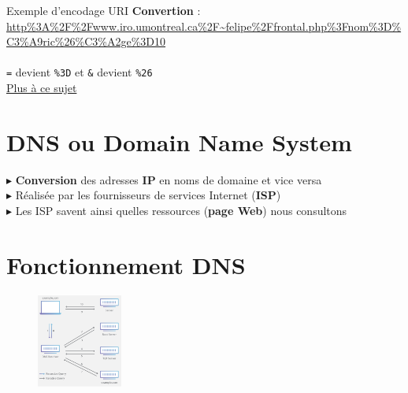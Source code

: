 \documentclass{report}
\begin{document}
\begin{multicols*}{3}
\begin{EExample}{Exemple d'encodage URI}{}
\textbf{Convertion} : \\   
\url{http%3A%2F%2Fwww.iro.umontreal.ca%2F~felipe%2Ffrontal.php%3Fnom%3D%C3%A9ric%26%C3%A2ge%3D10}   
\\ \\ 
\texttt{=} devient \texttt{\%3D}  et \texttt{\&} devient \texttt{\%26}          
\\
\textcolor{myb}{\href{https://www.w3schools.com/tags/ref_urlencode.ASP}{Plus à ce sujet}}
\end{EExample}


\section{DNS ou Domain Name System}
$\blacktriangleright$ \textbf{Conversion}   des adresses \textbf{IP} en noms de domaine et vice versa 
\\

$\blacktriangleright$ Réalisée par les fournisseurs de services Internet (\textbf{ISP}) 
\\

$\blacktriangleright$ Les ISP savent ainsi quelles ressources (\textbf{page Web}) nous consultons


\section{Fonctionnement DNS}

\begin{figure}[H]
\centering
\includegraphics[width=0.25\textwidth]{dns_diagram.png}
\end{figure}


\end{multicols*}
\end{document}
